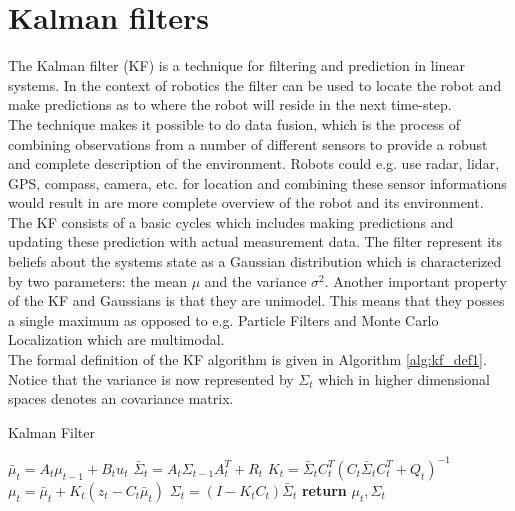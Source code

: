 
\section{Kalman filters}

The Kalman filter (KF) is a technique for filtering and prediction in linear systems. In the context of robotics the filter can be used to locate the robot and make predictions as to where the robot will reside in the next time-step.\\

The technique makes it possible to do data fusion, which is the process of combining observations from a number of different sensors to provide a robust and complete description of the environment. Robots could e.g. use radar, lidar, GPS, compass, camera, etc. for location and combining these sensor informations would result in are more complete overview of the robot and its environment.\\

The KF consists of a basic cycles which includes making predictions and updating these prediction with actual measurement data. The filter represent its beliefs about the systems state as a Gaussian distribution which is characterized by two parameters: the mean $\mu$ and the variance $\sigma^2$. Another important property of the KF and Gaussians is that they are unimodel. This means that they posses a single maximum as opposed to e.g. Particle Filters and Monte Carlo Localization which are multimodal.\\

The formal definition of the KF algorithm is given in Algorithm \ref{alg:kf_def1}. Notice that the variance is now represented by $\Sigma_{t}$ which in higher dimensional spaces denotes an covariance matrix.

\begin{center}
\begin{minipage}{.65\linewidth}
\begin{algorithm}[H]
\caption{Kalman Filter}
\label{alg:kf_def1}
\begin{algorithmic}[1]
  \State $\bar\mu_{t} = A_{t}\mu_{t-1} + B_{t}u_{t}$%
  \State $\bar\Sigma_{t} = A_{t}\Sigma_{t-1}A_{t}^T + R_{t}$
  \State $K_{t} = \bar\Sigma_{t}C_{t}^T(C_{t}\bar{\Sigma}_{t}C_{t}^T+Q_{t})^{-1}$
  \State $\mu_{t} = \bar\mu_{t} + K_{t}(z_{t} - C_{t}\bar\mu_{t})$
  \State $\Sigma_{t} = (I - K_{t}C_{t})\bar\Sigma_{t}$
  \State \textbf{return} $\mu_{t}, \Sigma_{t}$
\EndProcedure
\end{algorithmic}
\end{algorithm}
\end{minipage}
\end{center}

